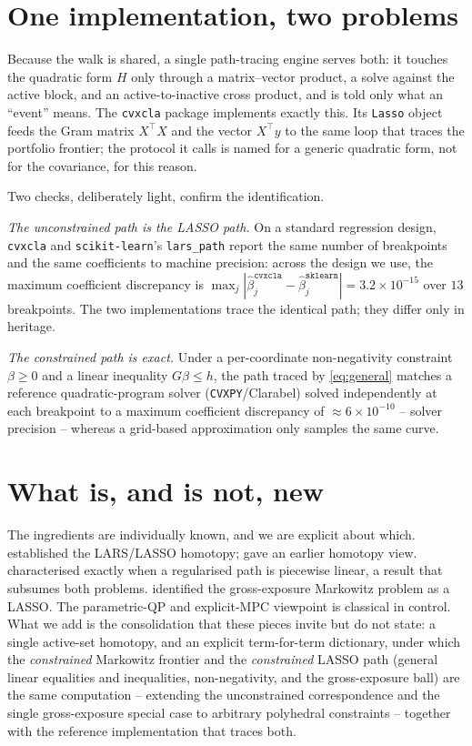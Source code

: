 \documentclass[11pt]{article}
\newcommand{\trans}{^{\top}}
\begin{document}
\section{One implementation, two problems}

Because the walk is shared, a single path-tracing engine serves both: it touches
the quadratic form $H$ only through a matrix--vector product, a solve against the
active block, and an active-to-inactive cross product, and is told only what an
``event'' means. The \texttt{cvxcla} package
\citep{cvxcla} implements exactly this. Its \texttt{Lasso} object feeds the Gram
matrix $X\trans X$ and the vector $X\trans y$ to the same loop that traces the
portfolio frontier; the protocol it calls is named for a generic quadratic form,
not for the covariance, for this reason.

Two checks, deliberately light, confirm the identification.

\emph{The unconstrained path is the LASSO path.} On a standard regression design,
\texttt{cvxcla} and \texttt{scikit-learn}'s \texttt{lars\_path} report the same
number of breakpoints and the same coefficients to machine precision: across the
design we use, the maximum coefficient discrepancy is
$\max_j |\hat\beta_j^{\texttt{cvxcla}} - \hat\beta_j^{\texttt{sklearn}}| = 3.2\times
10^{-15}$ over $13$ breakpoints. The two implementations trace the identical path;
they differ only in heritage.

\emph{The constrained path is exact.} Under a per-coordinate non-negativity
constraint $\beta\ge 0$ and a linear inequality $G\beta\le h$, the path traced by
\eqref{eq:general} matches a reference quadratic-program solver
(\texttt{CVXPY}/Clarabel) solved independently at each breakpoint to a maximum
coefficient discrepancy of $\approx 6\times 10^{-10}$ -- solver precision -- whereas
a grid-based approximation only samples the same curve.

\section{What is, and is not, new}

The ingredients are individually known, and we are explicit about which.
\citet{efron2004} established the LARS/LASSO homotopy; \citet{osborne2000} gave an
earlier homotopy view. \citet{rosset2007} characterised exactly when a regularised
path is piecewise linear, a result that subsumes both problems. \citet{brodie2009}
identified the gross-exposure Markowitz problem as a LASSO. The parametric-QP and
explicit-MPC viewpoint \citep{bemporad2002} is classical in control. What we add is
the consolidation that these pieces invite but do not state: a single active-set
homotopy, and an explicit term-for-term dictionary, under which the
\emph{constrained} Markowitz frontier and the \emph{constrained} LASSO path (general
linear equalities and inequalities, non-negativity, and the gross-exposure ball) are
the same computation -- extending the unconstrained correspondence and the single
gross-exposure special case to arbitrary polyhedral constraints -- together with the
reference implementation that traces both.
\end{document}
